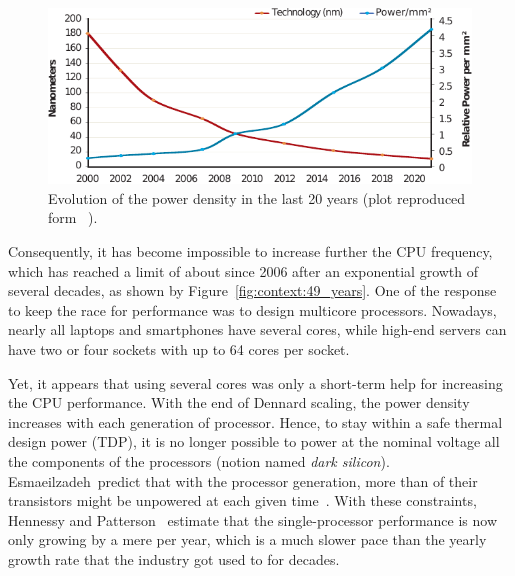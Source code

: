         \begin{figure}[htpb]
            \centering
            \includegraphics[width=\linewidth]{img/context/power_density.pdf}
            \caption{Evolution of the power density in the last 20 years (plot reproduced form ~\cite[Figure
            3]{Hennessy_2019}).}%
            \label{fig:context:power_density}
        \end{figure}

        Consequently, it has become impossible to increase further the CPU frequency, which has reached a limit of about
         since 2006 after an exponential growth of several decades, as shown by
        Figure~\ref{fig:context:49_years}. One of the response to keep the race for performance was to design multicore
        processors. Nowadays, nearly all laptops and smartphones have several cores, while high-end servers can have two
        or four sockets with up to 64 cores per socket.

        Yet, it appears that using several cores was only a short-term help for increasing the CPU
        performance. With the end of Dennard scaling, the power density increases with each generation of processor.
        Hence, to stay within a safe thermal design power (TDP), it is no longer possible to power at the nominal
        voltage all the components of the processors (notion named \emph{dark silicon}). Esmaeilzadeh~\etal predict
        that with the  processor generation, more than  of their transistors might
        be unpowered at each given time~\cite{Esmaeilzadeh_2011}. With these constraints, Hennessy and
        Patterson~\cite{Hennessy_2019,Hennessy_youtube} estimate that the single-processor performance is now only
        growing by a mere  per year, which is a much slower pace than the  yearly
        growth rate that the industry got used to for decades.



